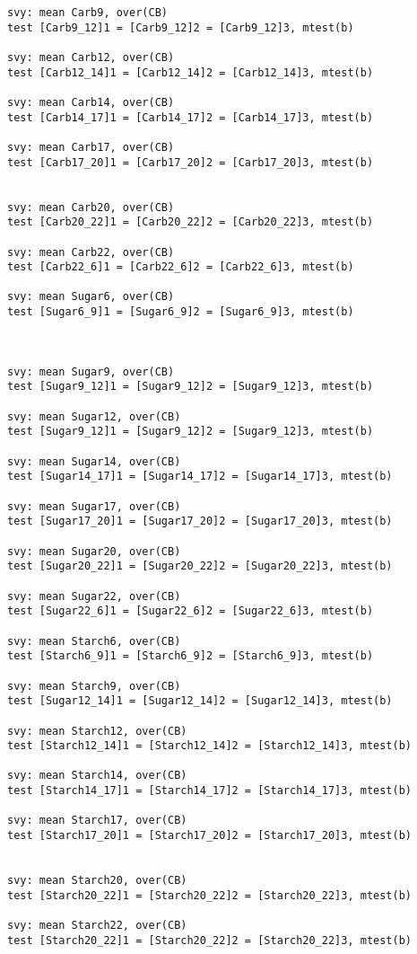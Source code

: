 \begin{verbatim}
svy: mean Carb9, over(CB)
test [Carb9_12]1 = [Carb9_12]2 = [Carb9_12]3, mtest(b) 

svy: mean Carb12, over(CB)
test [Carb12_14]1 = [Carb12_14]2 = [Carb12_14]3, mtest(b) 

svy: mean Carb14, over(CB)
test [Carb14_17]1 = [Carb14_17]2 = [Carb14_17]3, mtest(b) 

svy: mean Carb17, over(CB)
test [Carb17_20]1 = [Carb17_20]2 = [Carb17_20]3, mtest(b) 


svy: mean Carb20, over(CB)
test [Carb20_22]1 = [Carb20_22]2 = [Carb20_22]3, mtest(b) 

svy: mean Carb22, over(CB)
test [Carb22_6]1 = [Carb22_6]2 = [Carb22_6]3, mtest(b) 

svy: mean Sugar6, over(CB)
test [Sugar6_9]1 = [Sugar6_9]2 = [Sugar6_9]3, mtest(b) 



svy: mean Sugar9, over(CB)
test [Sugar9_12]1 = [Sugar9_12]2 = [Sugar9_12]3, mtest(b) 

svy: mean Sugar12, over(CB)
test [Sugar9_12]1 = [Sugar9_12]2 = [Sugar9_12]3, mtest(b) 

svy: mean Sugar14, over(CB)
test [Sugar14_17]1 = [Sugar14_17]2 = [Sugar14_17]3, mtest(b) 

svy: mean Sugar17, over(CB)
test [Sugar17_20]1 = [Sugar17_20]2 = [Sugar17_20]3, mtest(b) 

svy: mean Sugar20, over(CB)
test [Sugar20_22]1 = [Sugar20_22]2 = [Sugar20_22]3, mtest(b) 

svy: mean Sugar22, over(CB)
test [Sugar22_6]1 = [Sugar22_6]2 = [Sugar22_6]3, mtest(b) 

svy: mean Starch6, over(CB)
test [Starch6_9]1 = [Starch6_9]2 = [Starch6_9]3, mtest(b) 

svy: mean Starch9, over(CB)
test [Sugar12_14]1 = [Sugar12_14]2 = [Sugar12_14]3, mtest(b) 

svy: mean Starch12, over(CB)
test [Starch12_14]1 = [Starch12_14]2 = [Starch12_14]3, mtest(b) 

svy: mean Starch14, over(CB)
test [Starch14_17]1 = [Starch14_17]2 = [Starch14_17]3, mtest(b) 

svy: mean Starch17, over(CB)
test [Starch17_20]1 = [Starch17_20]2 = [Starch17_20]3, mtest(b) 


svy: mean Starch20, over(CB)
test [Starch20_22]1 = [Starch20_22]2 = [Starch20_22]3, mtest(b) 

svy: mean Starch22, over(CB)
test [Starch20_22]1 = [Starch20_22]2 = [Starch20_22]3, mtest(b) 


\end{verbatim}
